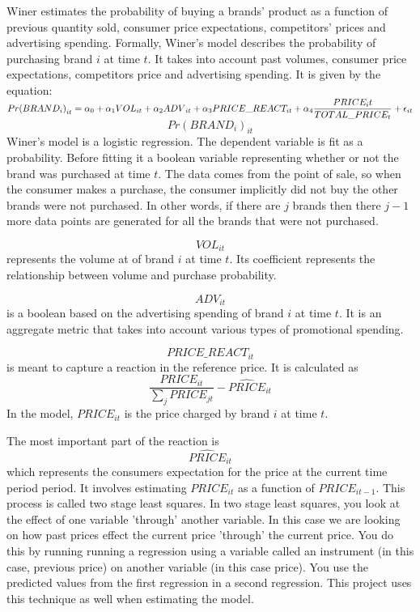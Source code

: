 \documentclass{article}
\begin{document}
Winer estimates the probability of buying a brands' product as a function of previous quantity sold, consumer price expectations, competitors' prices and advertising spending. Formally, Winer's model describes the probability of purchasing brand $i$ at time $t$. It takes into account past volumes, consumer price expectations, competitors price and advertising spending. It is given by the equation: \\

$ {Pr(BRAND_i)}_{it} = \alpha_0 + \alpha_1 {VOL}_{it} + \alpha_2 {ADV}_{it} +  \alpha_3 PRICE\_REACT_{it}  \medskip + \alpha_4 \dfrac{PRICE_it}{TOTAL\_PRICE_{t}} + \epsilon_{it}$\\

$${Pr(BRAND_i)}_{it} $$ Winer's model is a logistic regression. The dependent variable is fit as a probability. Before fitting it a boolean variable representing whether or not the brand was purchased at time $t$. The data comes from the point of sale, so when the consumer makes a purchase, the consumer implicitly did not buy the other brands were not purchased. In other words, if there are $j$ brands then there $j-1$ more data points are generated for all the brands that were not purchased. 

$$VOL_{it}$$ represents the volume at of brand $i$ at time $t$. Its coefficient represents the relationship between volume and purchase probability.

$$ADV_{it}$$ is a boolean based on the advertising spending of brand $i$ at time $t$. It is an aggregate metric that takes into account various types of promotional spending.

$$PRICE\_REACT_{it}$$ is meant to capture a reaction in the reference price. It is calculated as $$\dfrac{PRICE_{it}} {\sum_j PRICE_{jt}} - \widehat{PRICE}_{it}$$ In the model, ${PRICE}_{it}$ is the price charged by brand $i$ at time $t$. 

The most important part of the reaction is $$\widehat{PRICE}_{it}$$ which represents the consumers expectation for the price at the current time period period. It involves estimating ${PRICE}_{it}$ as a function of ${PRICE}_{it-1}$. This process is called two stage least squares. In two stage least squares, you look at the effect of one variable 'through' another variable.  In this case we are looking on how past prices effect the current price 'through' the current price. You do this by running running a regression using a variable called an instrument (in this case, previous price) on another variable (in this case price). You use the predicted values from the first regression in a second regression. This project uses this technique as well when estimating the model.
\end{document}
